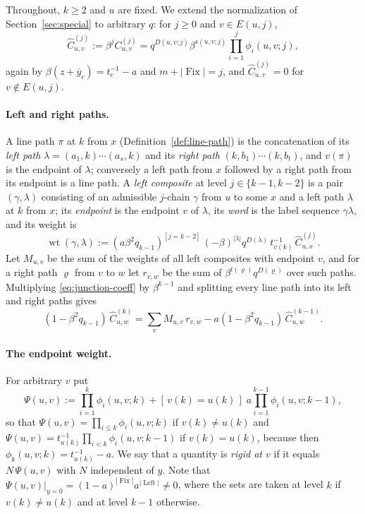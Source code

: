 \documentclass[11pt]{article}
\newcommand{\Fix}{\operatorname{Fix}}
\newcommand{\Left}{\operatorname{Left}}
\begin{document}
Throughout, $k\geq2$ and $u$ are fixed. We extend the normalization
of Section~\ref{sec:special} to arbitrary $q$: for $j\geq0$ and
$v\in E(u,j)$,
\[
 \widehat C^{(j)}_{u,v}:=\beta^{j}C^{(j)}_{u,v}
 =q^{D(u,v;j)}\beta^{s(u,v;j)}\prod_{i=1}^{j}\phi_i(u,v;j),
\]
again by $\beta(z+\overline y_c)=t_c^{-1}-a$ and $m+|\Fix|=j$, and
$\widehat C^{(j)}_{u,v}=0$ for $v\notin E(u,j)$.

\paragraph{Left and right paths.}
A line path $\pi$ at $k$ from $x$ (Definition~\ref{def:line-path}) is
the concatenation of its \emph{left path} $\lambda=(a_1,k)\cdots(a_s,k)$
and its \emph{right path} $(k,b_1)\cdots(k,b_t)$, and $v(\pi)$ is the
endpoint of $\lambda$; conversely a left path from $x$ followed by a
right path from its endpoint is a line path. A \emph{left composite}
at level $j\in\{k-1,k-2\}$ is a pair $(\gamma,\lambda)$ consisting of
an admissible $j$-chain $\gamma$ from $u$ to some $x$ and a left path
$\lambda$ at $k$ from $x$; its \emph{endpoint} is the endpoint $v$ of
$\lambda$, its \emph{word} is the label sequence $\gamma\lambda$, and
its weight is
\[
 \operatorname{wt}(\gamma,\lambda)
 :=(a\beta^2q_{k-1})^{[j=k-2]}\,
   (-\beta)^{|\lambda|}q^{D(\lambda)}\,t_{v(k)}^{-1}\,
   \widehat C^{(j)}_{u,x}.
\]
Let $M_{u,v}$ be the sum of the weights of all left composites with
endpoint $v$, and for a right path $\varrho$ from $v$ to $w$ let
$r_{v,w}$ be the sum of $\beta^{t(\varrho)}q^{D(\varrho)}$ over such
paths. Multiplying \eqref{eq:junction-coeff} by $\beta^{k-1}$ and
splitting every line path into its left and right paths gives
\begin{equation}\label{eq:junction-split}
 (1-\beta^2q_{k-1})\,\widehat C^{(k)}_{u,w}
 =\sum_{v}M_{u,v}\,r_{v,w}
  -a(1-\beta^2q_{k-1})\,\widehat C^{(k-1)}_{u,w}.
\end{equation}

\paragraph{The endpoint weight.}
For arbitrary $v$ put
\[
 \Psi(u,v):=\prod_{i=1}^{k}\phi_i(u,v;k)
   +[\,v(k)=u(k)\,]\;a\prod_{i=1}^{k-1}\phi_i(u,v;k-1),
\]
so that $\Psi(u,v)=\prod_{i\leq k}\phi_i(u,v;k)$ if $v(k)\neq u(k)$
and $\Psi(u,v)=t_{u(k)}^{-1}\prod_{i<k}\phi_i(u,v;k-1)$ if
$v(k)=u(k)$, because then $\phi_k(u,v;k)=t^{-1}_{u(k)}-a$. We say
that a quantity is \emph{rigid at $v$} if it equals $N\,\Psi(u,v)$
with $N$ independent of $y$. Note that
$\Psi(u,v)|_{y=0}=(1-a)^{|\Fix|}a^{|\Left|}\neq0$, where the sets are
taken at level $k$ if $v(k)\ne u(k)$ and at level $k-1$ otherwise.
\end{document}
